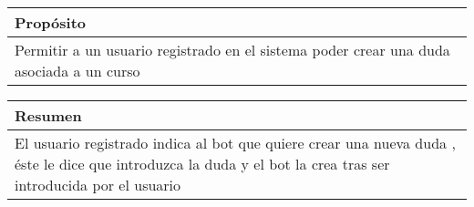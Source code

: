 \begin{table}[H]

\begin{tabular}{|m{10cm}|}
\hline\rowcolor{Gray}
{\bf Propósito}\\
\hline
{Permitir a un usuario registrado en el sistema poder crear una duda asociada a un curso} \\
\hline

\end{tabular}


\end{table}

\begin{table}[!ht]

\begin{tabular}{|m{10cm}|}
\hline\rowcolor{Gray}
{\bf Resumen}\\
\hline
{El usuario registrado indica al bot que quiere crear una nueva duda , éste le dice que introduzca la duda y el bot la crea tras ser introducida por el usuario} \\
\hline

\end{tabular}



\end{table}

